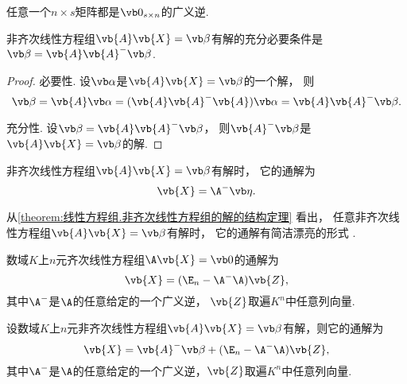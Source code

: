 \begin{property}\label{theorem:线性方程组.广义逆的性质2}
任意一个\(n \times s\)矩阵都是\(\vb0_{s \times n}\)的广义逆.
\end{property}

\begin{theorem}[非齐次线性方程组的相容性定理]\label{theorem:线性方程组.非齐次线性方程组的相容性定理}
非齐次线性方程组\(\vb{A} \vb{X} = \vb\beta\)有解的充分必要条件是
\(\vb\beta = \vb{A} \vb{A}^- \vb\beta\).
\begin{proof}
必要性.
设\(\vb\alpha\)是\(\vb{A} \vb{X} = \vb\beta\)的一个解，
则\[
	\vb\beta
	= \vb{A} \vb\alpha
	= (\vb{A} \vb{A}^- \vb{A}) \vb\alpha
	= \vb{A} \vb{A}^- \vb\beta.
\]

充分性.
设\(\vb\beta = \vb{A} \vb{A}^- \vb\beta\)，
则\(\vb{A}^- \vb\beta\)是\(\vb{A} \vb{X} = \vb\beta\)的解.
\end{proof}
\end{theorem}

\begin{theorem}[非齐次线性方程组的解的结构定理]\label{theorem:线性方程组.非齐次线性方程组的解的结构定理}
非齐次线性方程组\(\vb{A} \vb{X} = \vb\beta\)有解时，
它的通解为\begin{equation}\label{equation:线性方程组.非齐次线性方程组的通解1}
	\vb{X} = \A^- \b.
\end{equation}
\end{theorem}
从\cref{theorem:线性方程组.非齐次线性方程组的解的结构定理} 看出，
任意非齐次线性方程组\(\vb{A} \vb{X} = \vb\beta\)有解时，
它的通解有简洁漂亮的形式 .

\begin{theorem}[齐次线性方程组的解的结构定理]\label{theorem:线性方程组.齐次线性方程组的解的结构定理}
数域\(K\)上\(n\)元齐次线性方程组\(\A\vb{X}=\vb0\)的通解为\begin{equation}\label{equation:线性方程组.齐次线性方程组的通解}
	\vb{X}=(\E_n - \A^- \A) \vb{Z},
\end{equation}
其中\(\A^-\)是\(\A\)的任意给定的一个广义逆，
\(\vb{Z}\)取遍\(K^n\)中任意列向量.
\end{theorem}

\begin{corollary}\label{theorem:线性方程组.齐次线性方程组的解的结构定理.推论1}
设数域\(K\)上\(n\)元非齐次线性方程组\(\vb{A} \vb{X} = \vb\beta\)有解，则它的通解为\begin{equation}\label{equation:线性方程组.非齐次线性方程组的通解2}
	\vb{X} = \vb{A}^- \vb\beta + (\E_n - \A^- \A) \vb{Z},
\end{equation}
其中\(\A^-\)是\(\A\)的任意给定的一个广义逆，\(\vb{Z}\)取遍\(K^n\)中任意列向量.
\end{corollary}

